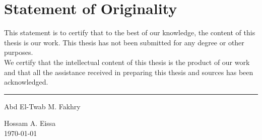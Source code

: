 \chapter*{Statement of Originality}

This statement is to certify that to the best of our knowledge, the content of this thesis is our work. This thesis has not been submitted for any degree or other purposes. \\[4pt]
\noindent
We certify that the intellectual content of this thesis is the product of our work and that all the assistance received in preparing this thesis and sources has been acknowledged. \\[8pt]

\begin{flushright}
  \itshape
  \par\noindent\rule{0.30\textwidth}{0.4pt}\par
  Abd El-Twab M. Fakhry\par
  Hossam A. Eissa \\[8pt]

  \footnotesize
  \normalshape
  \today
\end{flushright}
